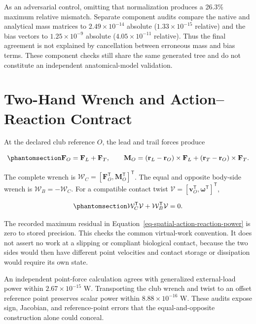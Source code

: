 \documentclass[
  letterpaper,
]{report}
\begin{document}
As an adversarial control, omitting that normalization produces a 26.3\%
maximum relative mismatch. Separate component audits compare the native
and analytical mass matrices to \(2.49\times10^{-14}\) absolute
(\(1.33\times10^{-15}\) relative) and the bias vectors to
\(1.25\times10^{-9}\) absolute (\(4.05\times10^{-11}\) relative). Thus
the final agreement is not explained by cancellation between erroneous
mass and bias terms. These component checks still share the same
generated tree and do not constitute an independent anatomical-model
validation.

\section{Two-Hand Wrench and Action--Reaction
Contract}\label{sec-spatial-hand-wrench}

At the declared club reference \(O\), the lead and trail forces produce

\begin{equation}\phantomsection\label{eq-spatial-two-hand-wrench}{
\mathbf F_O=\mathbf F_L+\mathbf F_T,
\qquad
\mathbf M_O=
(\mathbf r_L-\mathbf r_O)\times\mathbf F_L
+(\mathbf r_T-\mathbf r_O)\times\mathbf F_T.
}\end{equation}

The complete wrench is
\(\mathcal W_C=[\mathbf F_O^{\mathsf T},\mathbf M_O^{\mathsf T}]^{\mathsf T}\).
The equal and opposite body-side wrench is
\(\mathcal W_B=-\mathcal W_C\). For a compatible contact twist
\(\mathcal V=[\mathbf v_O^{\mathsf T},\boldsymbol\omega^{\mathsf T}]^{\mathsf T}\),

\begin{equation}\phantomsection\label{eq-spatial-action-reaction-power}{
\mathcal W_C^{\mathsf T}\mathcal V
+\mathcal W_B^{\mathsf T}\mathcal V=0.
}\end{equation}

The recorded maximum residual in
Equation~\ref{eq-spatial-action-reaction-power} is zero to stored
precision. This checks the common virtual-work convention. It does not
assert no work at a slipping or compliant biological contact, because
the two sides would then have different point velocities and contact
storage or dissipation would require its own state.

An independent point-force calculation agrees with generalized
external-load power within \(2.67\times10^{-15}\) W. Transporting the
club wrench and twist to an offset reference point preserves scalar
power within \(8.88\times10^{-16}\) W. These audits expose sign,
Jacobian, and reference-point errors that the equal-and-opposite
construction alone could conceal.
\end{document}
